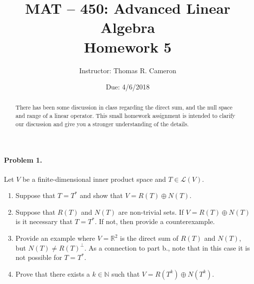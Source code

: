 \documentclass{article}
\title{MAT -- 450: Advanced Linear Algebra\\
\large{Homework 5}}
\author{Instructor: Thomas R. Cameron}
\date{Due: 4/6/2018}
\begin{document}
\maketitle

\begin{abstract}
There has been some discussion in class regarding the direct sum, and the null space and range of a linear operator. This small homework assignment is intended to clarify our discussion and give you a stronger understanding of the details. 
\end{abstract}

\paragraph*{Problem 1.} Let $V$ be a finite-dimensional inner product space and $T\in\mathcal{L}(V)$.
\renewcommand{\theenumi}{\alph{enumi}}
\begin{enumerate}
\item	Suppose that $T=T^{*}$ and show that $V=R(T)\oplus N(T)$.
\item	Suppose that $R(T)$ and $N(T)$ are non-trivial sets. If $V=R(T)\oplus N(T)$ is it necessary that $T=T^{*}$. If not, then provide a counterexample.
\item	Provide an example where $V=\mathbb{R}^{2}$ is the direct sum of $R(T)$ and $N(T)$, but $N(T)\neq R(T)^{\perp}$. As a connection to part b., note that in this case it is not possible for $T=T^{*}$. 
\item	Prove that there exists a $k\in\mathbb{N}$ such that $V=R(T^{k})\oplus N(T^{k})$. 
\end{enumerate}
\end{document}
